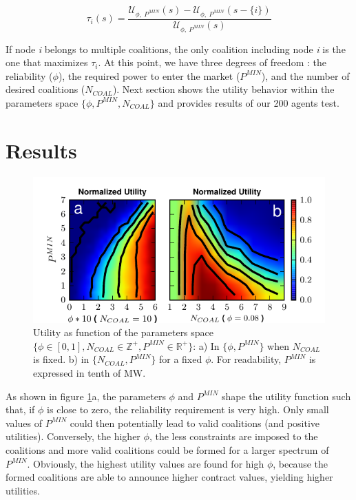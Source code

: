 \documentclass[conference]{IEEEtran}
\begin{document}
\begin{equation}
\tau_{i}(s) = \dfrac{\mathcal{U}_{\phi,\ P^{MIN}}(s) - \mathcal{U}_{\phi,\ P^{MIN}}(s-\{i\}) }{\mathcal{U}_{\phi,\ P^{MIN}}(s)}
\label{tau}
\end{equation}

If node \textit{i} belongs to  multiple coalitions, the only coalition including node \textit{i} is the one that maximizes $ \tau_{i} $. At this point, we have three degrees of freedom : the reliability ($ \phi $), the required power to enter the market ($P^{MIN}$), and the number of desired coalitions ($ N_{COAL} $). Next section shows the utility behavior within the parameters space $ \{\phi,P^{MIN},N_{COAL} \} $ and provides results of our 200 agents test.

\section{Results}
\label{sec:results}

\begin{figure}
 \centering
  \includegraphics[scale=0.9]{./figure9/util}
\caption{Utility as function of the parameters space $\{\phi \in [0,1], N_{COAL}\in \mathbb{Z}^+, P^{MIN} \in \mathbb{R}^+\}$: a) In $ \{\phi, P^{MIN}\} $ when $ N_{COAL} $ is fixed. b) in $ \{N_{COAL}, P^{MIN}\} $ for a fixed $ \phi $. For readability, $ P^{MIN} $ is expressed in tenth of MW.}
\label{Fig2}
\end{figure}

As shown in figure \ref{Fig2}a, the parameters $\phi$ and $P^{MIN}$ shape the utility function such that, if $ \phi $ is close to zero, the reliability requirement is very high. Only small values of $ P^{MIN}$ could then potentially lead to valid coalitions (and positive utilities). Conversely, the higher $\phi$, the less constraints are imposed to the coalitions and more valid coalitions could be formed for a larger spectrum of $ P^{MIN}$. Obviously, the highest utility values are found for high $ \phi $, because the formed coalitions are able to announce higher contract values, yielding higher utilities. 
\end{document}
